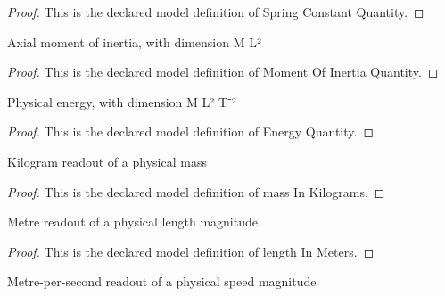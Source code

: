 \begin{proof}
  This is the declared model definition of Spring Constant Quantity.
\end{proof}
\begin{definition}
  \label{def:physics:phyx-mini-0279:phyxminiproblems-problemphyxmini0279-momentofinertiaquantity}
  Axial moment of inertia, with dimension M L²
\end{definition}
\begin{proof}
  This is the declared model definition of Moment Of Inertia Quantity.
\end{proof}
\begin{definition}
  \label{def:physics:phyx-mini-0279:phyxminiproblems-problemphyxmini0279-energyquantity}
  Physical energy, with dimension M L² T⁻²
\end{definition}
\begin{proof}
  This is the declared model definition of Energy Quantity.
\end{proof}
\begin{definition}
  \label{def:physics:phyx-mini-0279:phyxminiproblems-problemphyxmini0279-massinkilograms}
  Kilogram readout of a physical mass
\end{definition}
\begin{proof}
  This is the declared model definition of mass In Kilograms.
\end{proof}
\begin{definition}
  \label{def:physics:phyx-mini-0279:phyxminiproblems-problemphyxmini0279-lengthinmeters}
  Metre readout of a physical length magnitude
\end{definition}
\begin{proof}
  This is the declared model definition of length In Meters.
\end{proof}
\begin{definition}
  \label{def:physics:phyx-mini-0279:phyxminiproblems-problemphyxmini0279-speedinmeterspersecond}
  Metre-per-second readout of a physical speed magnitude
\end{definition}
